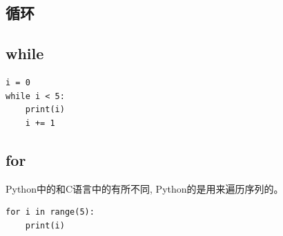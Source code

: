 \subsection{循环}
\subsection{while}
\begin{lstlisting}[style=pythonstyle,numbers=none]
i = 0
while i < 5:
    print(i)
    i += 1
\end{lstlisting}

\subsection{for}
Python中的和C语言中的有所不同, Python的是用来遍历序列的。

\begin{lstlisting}[style=demostyle,numbers=none]
for i in range(5):
    print(i)
\end{lstlisting}

